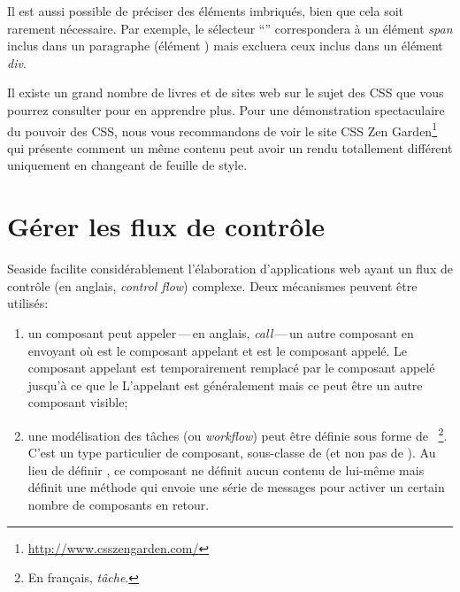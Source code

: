 \documentclass[a4paper,10pt,twoside]{book}
\begin{document}
Il est aussi possible de préciser des éléments imbriqués, bien que
cela soit rarement nécessaire. Par exemple, le sélecteur
``'' correspondera à un élément \emph{span} inclus dans un
paragraphe (élément ) mais excluera ceux inclus dans un élément
\emph{div}.

Il existe un grand nombre de livres et de sites web sur le sujet des
CSS que vous pourrez consulter pour en apprendre plus.
Pour une démonstration spectaculaire du pouvoir des CSS, nous vous
recommandons de voir le site CSS Zen
Garden\footnote{\url{http://www.csszengarden.com/}} qui présente
comment un même contenu peut avoir un rendu totallement différent
uniquement en changeant de feuille de style.

\section{Gérer les flux de contrôle} %

Seaside facilite considérablement l'élaboration d'applications web
ayant un flux de contrôle (en anglais, \emph{control flow}) complexe.
Deux mécanismes peuvent être utilisés:

\begin{enumerate}
  \item un composant peut appeler\,---\,en anglais,
    \emph{call}\,---\,un autre composant en envoyant
où  est le composant appelant et  est le
composant appelé.
Le composant appelant est temporairement remplacé par le composant
appelé jusqu'à ce que le 
L'appelant est généralement  mais ce peut être un autre
composant visible;
  \item une modélisation des tâches (ou \emph{workflow}) peut être définie
    sous forme de ~\footnote{En
      français, \emph{tâche}.}.
    C'est un type particulier de composant, sous-classe de
     (et non pas de ).
Au lieu de définir , ce composant ne définit
aucun contenu de lui-même mais définit une méthode  qui envoie
une série de messages  pour activer un certain nombre de
composants en retour.
\end{enumerate}
\end{document}
